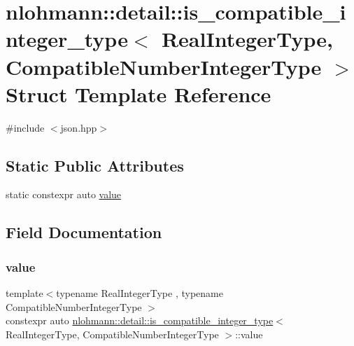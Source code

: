 \hypertarget{structnlohmann_1_1detail_1_1is__compatible__integer__type}{}\section{nlohmann\+::detail\+::is\+\_\+compatible\+\_\+integer\+\_\+type$<$ Real\+Integer\+Type, Compatible\+Number\+Integer\+Type $>$ Struct Template Reference}
\label{structnlohmann_1_1detail_1_1is__compatible__integer__type}


{\ttfamily \#include $<$json.\+hpp$>$}

\subsection*{Static Public Attributes}
\begin{DoxyCompactItemize}
\item 
static constexpr auto \mbox{\hyperlink{structnlohmann_1_1detail_1_1is__compatible__integer__type_ac5e5bd39773676564c73d3dd2a9c6e0a}{value}}
\end{DoxyCompactItemize}


\subsection{Field Documentation}
\mbox{\label{structnlohmann_1_1detail_1_1is__compatible__integer__type_ac5e5bd39773676564c73d3dd2a9c6e0a}} 
\subsubsection{\texorpdfstring{value}{value}}
{\footnotesize\ttfamily template$<$typename Real\+Integer\+Type , typename Compatible\+Number\+Integer\+Type $>$ \\
constexpr auto \mbox{\hyperlink{structnlohmann_1_1detail_1_1is__compatible__integer__type}{nlohmann\+::detail\+::is\+\_\+compatible\+\_\+integer\+\_\+type}}$<$ Real\+Integer\+Type, Compatible\+Number\+Integer\+Type $>$\+::value\hspace{0.3cm}{\ttfamily [static]}}


